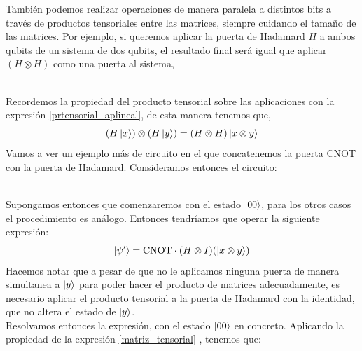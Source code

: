 \documentclass[a4paper]{article}
\numberwithin{equation}{section}
\begin{document}
También podemos realizar operaciones de manera paralela a distintos bits a través de productos tensoriales entre las matrices, siempre cuidando el tamaño de las matrices. Por ejemplo, si queremos aplicar la puerta de Hadamard $H$ a ambos qubits de un sistema de dos qubits, el resultado final será igual que aplicar $(H\otimes H)$ como una puerta al sistema,
\begin{figure}[h]
\centering
{}
\end{figure} \\
Recordemos la propiedad del producto tensorial sobre las aplicaciones con la expresión \ref{prtensorial_aplineal}, de esta manera tenemos que,
\begin{equation} \label{matriz_tensorial}
(H\ket{x})\otimes(H\ket{y}) = (H\otimes H)\ket{x\otimes y}
\end{equation}
Vamos a ver un ejemplo más de circuito en el que concatenemos la puerta CNOT con la puerta de Hadamard. Consideramos entonces el circuito:
\begin{figure}[h]
\centering
{}
\end{figure}\\
Supongamos entonces que comenzaremos con el estado $\ket{00}$, para los otros casos el procedimiento es análogo. Entonces tendríamos que operar la siguiente expresión:
\begin{equation}
\ket{\psi'} = \textrm{CNOT}\cdot(H\otimes I)(\ket{x\otimes y})
\end{equation}
Hacemos notar que a pesar de que no le aplicamos ninguna puerta de manera simultanea a $\ket{y}$ para poder hacer el producto de matrices adecuadamente, es necesario aplicar el producto tensorial a la puerta de Hadamard con la identidad, que no altera el estado de $\ket{y}$.\\
Resolvamos entonces la expresión, con el estado $\ket{00}$ en concreto. Aplicando la propiedad de la expresión \ref{matriz_tensorial} , tenemos que:
\end{document}
